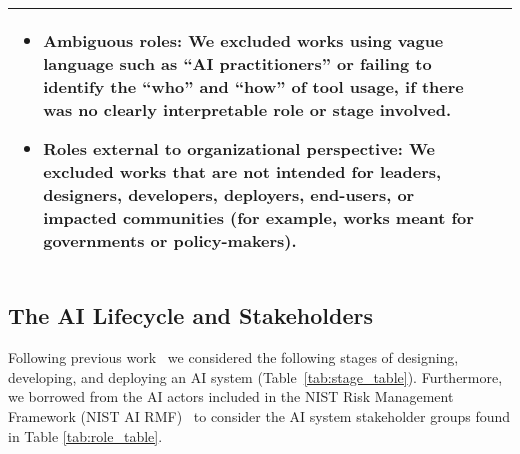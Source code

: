 \begin{table}[]
\begin{tabular}{p{}p{}}
\begin{itemize}
    \item Ambiguous roles: We excluded works using vague language such as ``AI practitioners'' or failing to identify the ``who'' and ``how'' of tool usage, if there was no clearly interpretable role or stage involved. 
    \item Roles external to organizational perspective: We excluded works that are not intended for leaders, designers, developers, deployers, end-users, or impacted communities (for example, works meant for governments or policy-makers). 
\end{itemize} \\ 
         \bottomrule
    \end{tabular}
    \label{tab:inclusion_exclusion_criteria}
\end{table}

\subsection{The AI Lifecycle and Stakeholders}

Following previous work~\cite{black2023toward, NIST2023, Ortega2024} we considered the following stages of designing, developing, and deploying an AI system (Table~\ref{tab:stage_table}).
Furthermore, we borrowed from the AI actors included in the NIST Risk Management Framework (NIST AI RMF)~\cite{NIST2023} to consider the AI system stakeholder groups found in Table \ref{tab:role_table}.


